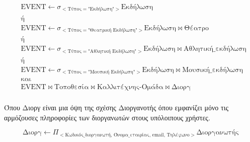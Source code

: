 \begin{equation}
  \begin{split}
    &\text{EVENT} \leftarrow \sigma_{<\text{Τύπος} =
      \text{"Εκδήλωση"}>}\text{Εκδήλωση} \\
    &\text{ή}\\
    &\text{EVENT} \leftarrow \sigma_{<\text{Τύπος} = \text{"Θεατρική
        Εκδήλωση"}>}\text{Εκδήλωση} \bowtie \text{Θέατρο} \\
    &\text{ή} \\
    &\text{EVENT} \leftarrow \sigma_{<\text{Τύπος} = \text{"Αθλητική
        Εκδήλωση"}>}\text{Εκδήλωση} \bowtie \text{Αθλητική\_εκδήλωση} \\
    &\text{ή} \\
    &\text{EVENT} \leftarrow \sigma_{<\text{Τύπος} = \text{"Μουσική
        Εκδήλωση"}>}\text{Εκδήλωση} \bowtie \text{Μουσική\_εκδήλωση} \\
    &\text{και} \\
    &\text{EVENT} \bowtie \text{Τοποθεσία} \bowtie
    \text{Καλλιτέχνης-Ομάδα} \bowtie \text{Διοργ} \\
  \end{split}
\end{equation}

Όπου Διοργ είναι μια όψη της σχέσης Διοργανοτής όπου εμφανίζει μόνο
τις αρμόζουσες πληροφορίες των διοργανωτών στους υπόλοιπους χρήστες.

\begin{equation}
  \text{Διοργ} \leftarrow \Pi_{<\text{Κωδικός\_διοργανωτή,
      Όνομα\_εταιρίας, email, Τηλέφωνο}>}\text{Διοργανωτής}
\end{equation}




  

